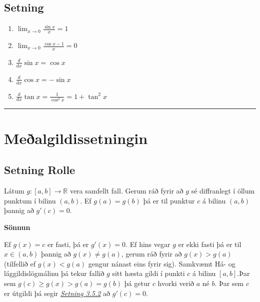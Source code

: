 \documentclass[a4paper,10pt,icelandic]{sphinxmanual}
\begin{document}
\subsection{Setning}
\label{kafli03:id12}\begin{enumerate}
\item {} 
\(\displaystyle\lim_{x\rightarrow 0}\frac{\sin x}{x}=1\)

\item {} 
\(\displaystyle\lim_{x\rightarrow 0}\frac{\cos x-1}{x}=0\)

\item {} 
\(\displaystyle\frac{d}{dx}\sin x=\cos x\)

\item {} 
\(\displaystyle\frac{d}{dx}\cos x=-\sin x\)

\item {} 
\(\displaystyle\frac{d}{dx}\tan x=\frac{1}{\cos^2 x}=1+\tan^2 x\)

\end{enumerate}


\bigskip\hrule{}\bigskip



\section{Meðalgildissetningin}
\label{kafli03:mealgildissetningin}

\subsection{Setning Rolle}
\label{kafli03:setning-rolle}\label{kafli03:index-6}\label{kafli03:rolle}
Látum \(g:[a,b]\rightarrow{{\mathbb  R}}\) vera samfellt fall. Gerum
ráð fyrir að \(g\) sé diffranlegt í öllum punktum í bilinu
\((a,b)\). Ef \(g(a)=g(b)\) þá er til punktur \(c\) á bilinu
\((a,b)\) þannig að \(g'(c)=0\).

\textbf{Sönnun}

Ef \(g(x)=c\) er fasti, þá er \(g'(x)=0\). Ef hins vegar
\(g\) er ekki fasti þá er til \(x \in (a,b)\) þannig að
\(g(x)\neq g(a)\), gerum ráð fyrir að \(g(x)>g(a)\)
(tilfellið ef \(g(x)<g(a)\) gengur nánast eins fyrir sig).
Samkvæmt Há- og lággildislögmálinu
þá tekur fallið \(g\) sitt hæsta
gildi í punkti \(c\) á bilinu \([a,b]\).Þar sem
\(g(c)\geq g(x) >  g(a) = g(b)\) þá getur \(c\) hvorki verið
\(a\) né \(b\).
Þar sem \(c\)
er útgildi þá segir {\hyperref[kafli03:setning\string-3\string-5\string-2]{\emph{Setning 3.5.2}}} að \(g'(c)=0\).
\end{document}
